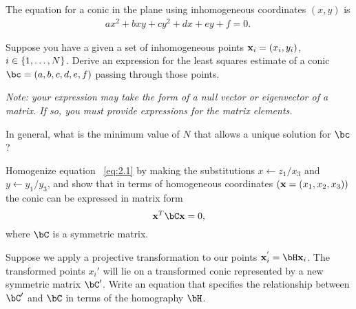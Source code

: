 \begin{problem}
  The equation for a conic in the plane using inhomogeneous
  coordinates $(x, y)$ is
  \begin{align}
    ax^2 + bxy + cy^2 + dx + ey + f = 0.~\label{eq:2.1}
  \end{align}

  \begin{enumalph}
    \item Suppose you have a given a set of inhomogeneous points
      $\mathbf{x}_i = (x_i, y_i)$, $i \in \left\{1, \ldots, N\right\}$.
      Derive an expression for the least squares estimate
      of a conic $\bc = (a, b, c, d, e, f)$ passing through those points.
      
      \step
      \emph{
        Note: your expression may take the form of a
        null vector or eigenvector of a matrix.
        If so, you must provide expressions
        for the matrix elements.
      }
      \begin{Answer}
        
      \end{Answer}
    \item In general, what is the minimum value of $N$ that
      allows a unique solution for $\bc$?
      \begin{Answer}

      \end{Answer}

    \item Homogenize equation ~\ref{eq:2.1} by making the
      substitutions $x \gets z_1/x_3$ and $y \gets y_1/y_3$,
      and show that in terms of homogeneous coordinates
      $(\mathbf{x} = (x_1, x_2, x_3))$ the conic can be expressed in
      matrix form
      \[ \bx^T\bC\bx = 0, \]
      where $\bC$ is a symmetric matrix.
      \begin{Answer}

      \end{Answer}

    \item Suppose we apply a projective transformation to our
      points $\bx_i^{'} = \bH\bx_i$.
      The transformed points $x_i'$ will lie on a transformed
      conic represented by a new symmetric matrix $\bC'$.
      Write an equation that specifies the relationship between
      $\bC'$ and $\bC$ in terms of the homography $\bH$.
  \end{enumalph}
\end{problem}
